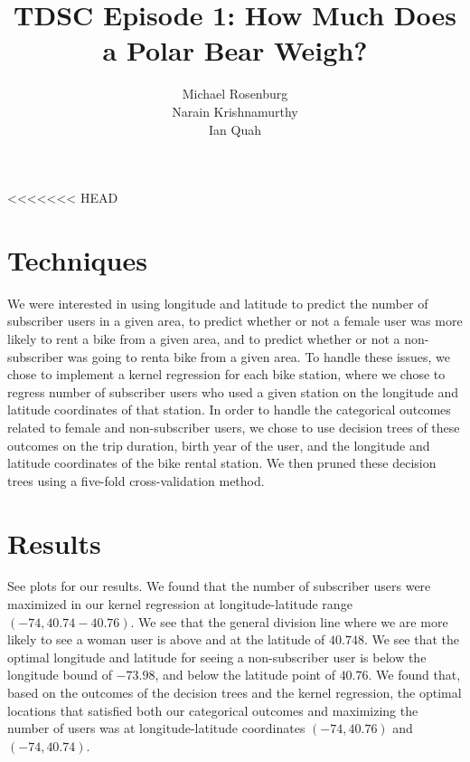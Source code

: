\documentclass{article}
\title{TDSC Episode 1: How Much Does a Polar Bear Weigh?}
\author{Michael Rosenburg \\ Narain Krishnamurthy \\ Ian Quah}
\begin{document}
\maketitle

<<<<<<< HEAD
\section{Techniques}
We were interested in using longitude and latitude to predict the number of
subscriber users in a given area, to predict whether or not a female user
was more likely to rent a bike from a given area, and to predict whether or
not a non-subscriber was going to renta  bike from a given area. To handle these
issues, we chose to implement a kernel regression for each bike station, where
we chose to regress number of subscriber users who used a given station on the
longitude and latitude coordinates of that station. In order to handle the
categorical outcomes related to female and non-subscriber users, we chose to
use decision trees of these outcomes on the trip duration, birth year of the
user, and the longitude and latitude coordinates of the bike rental station.
We then pruned these decision trees using a five-fold cross-validation method.

\section{Results}
See plots for our results. We found that the number of subscriber users were
maximized in our kernel regression at longitude-latitude range $(-74,40.74
-40.76).$ We see that the general division line where we are more likely to
see a woman user is above and at the latitude of $40.748$. We see that the
optimal longitude and latitude for seeing a non-subscriber user is below
the longitude bound of $-73.98$, and below the latitude point of $40.76$.
We found that, based on the outcomes of the decision
trees and the kernel regression, the optimal locations that satisfied both
our categorical outcomes and maximizing the number of users was at
longitude-latitude coordinates $(-74, 40.76)$ and $(-74, 40.74)$.
\end{document}
